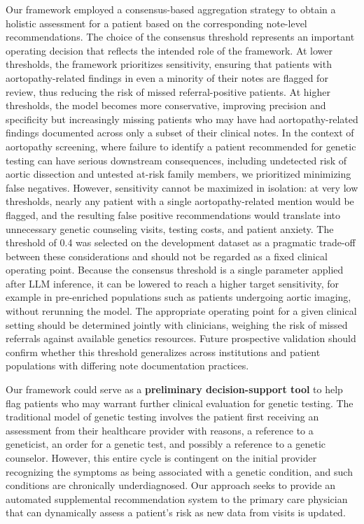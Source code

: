 \documentclass[fleqn,10pt]{wlscirep}
\begin{document}
Our framework employed a consensus-based aggregation strategy to obtain a holistic assessment for a patient based on the corresponding note-level recommendations. The choice of the consensus threshold represents an important operating decision that reflects the intended role of the framework. At lower thresholds, the framework prioritizes sensitivity, ensuring that patients with aortopathy-related findings in even a minority of their notes are flagged for review, thus reducing the risk of missed referral-positive patients. At higher thresholds, the model becomes more conservative, improving precision and specificity but increasingly missing patients who may have had aortopathy-related findings documented across only a subset of their clinical notes. In the context of aortopathy screening, where failure to identify a patient recommended for genetic testing can have serious downstream consequences, including undetected risk of aortic dissection and untested at-risk family members, we prioritized minimizing false negatives. However, sensitivity cannot be maximized in isolation: at very low thresholds, nearly any patient with a single aortopathy-related mention would be flagged, and the resulting false positive recommendations would translate into unnecessary genetic counseling visits, testing costs, and patient anxiety. The threshold of 0.4 was selected on the development dataset as a pragmatic trade-off between these considerations and should not be regarded as a fixed clinical operating point. Because the consensus threshold is a single parameter applied after LLM inference, it can be lowered to reach a higher target sensitivity, for example in pre-enriched populations such as patients undergoing aortic imaging, without rerunning the model. The appropriate operating point for a given clinical setting should be determined jointly with clinicians, weighing the risk of missed referrals against available genetics resources. Future prospective validation should confirm whether this threshold generalizes across institutions and patient populations with differing note documentation practices.

Our framework could serve as a \textbf{preliminary decision-support tool} to help flag patients who may warrant further clinical evaluation for genetic testing. The traditional model of genetic testing involves the patient first receiving an assessment from their healthcare provider with reasons, a reference to a geneticist, an order for a genetic test, and possibly a reference to a genetic counselor. However, this entire cycle is contingent on the initial provider recognizing the symptoms as being associated with a genetic condition, and such conditions are chronically underdiagnosed.\cite{pederson2024commentary} Our approach seeks to provide an automated supplemental recommendation system to the primary care physician that can dynamically assess a patient’s risk as new data from visits is updated. 
\end{document}
